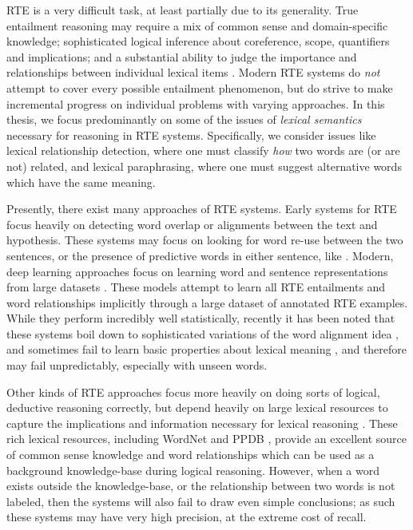 RTE is a very difficult task, at least partially due to its generality.  True
entailment reasoning may require a mix of common sense and domain-specific
knowledge; sophisticated logical inference about coreference, scope,
quantifiers and implications; and a substantial ability to judge the importance
and relationships between individual lexical items \cite{dagan:2006:mlc}.
Modern RTE systems do {\em not} attempt
to cover every possible entailment phenomenon, but do strive to make
incremental progress on individual problems with varying approaches. In this
thesis, we focus predominantly on some of the issues of {\em lexical semantics}
necessary for reasoning in RTE systems. Specifically, we consider issues like
lexical relationship detection, where one must classify {\em how} two words are
(or are not) related, and lexical paraphrasing, where one must suggest
alternative words which have the same meaning.

Presently, there exist many approaches of RTE systems. Early systems for RTE
focus heavily on detecting word overlap or alignments between the text and
hypothesis. These systems may focus on looking for word re-use between the
two sentences, or the presence of predictive words in either sentence, like
 \cite{dagan:2006:mlc}. Modern, deep learning approaches focus
on learning word and sentence representations from large datasets
\cite{bowman:2015:emnlp,cheng:2016:emnlp,bowman:2016:acl,mou:2016:acl,rocktaschel:2016:iclr,vendrov:2016:iclr}.
These models attempt to learn all RTE entailments and word relationships
implicitly through a large dataset of annotated RTE examples. While they
perform incredibly well statistically, recently it has been noted that these
systems boil down to sophisticated variations of the word alignment idea
\cite{parikh:2016:emnlp}, and sometimes fail to learn basic properties about
lexical meaning \cite{pavlick:2016:acl}, and therefore may fail unpredictably,
especially with unseen words.

Other kinds of RTE approaches focus more heavily on doing sorts of logical,
deductive reasoning correctly, but depend heavily on large lexical resources to
capture the implications and information necessary for lexical reasoning
\cite{maccartney:2008:coling,bjerva:2014:semeval,beltagy:2016:cl}. These rich
lexical resources, including WordNet \cite{miller:1995:acm} and PPDB
\cite{ganitkevitch:2013:naacl}, provide an excellent source of common sense
knowledge and word relationships which can be used as a background
knowledge-base during logical reasoning. However, when a word exists outside
the knowledge-base, or the relationship between two words is not labeled, then
the systems will also fail to draw even simple conclusions; as such these
systems may have very high precision, at the extreme cost of recall.

